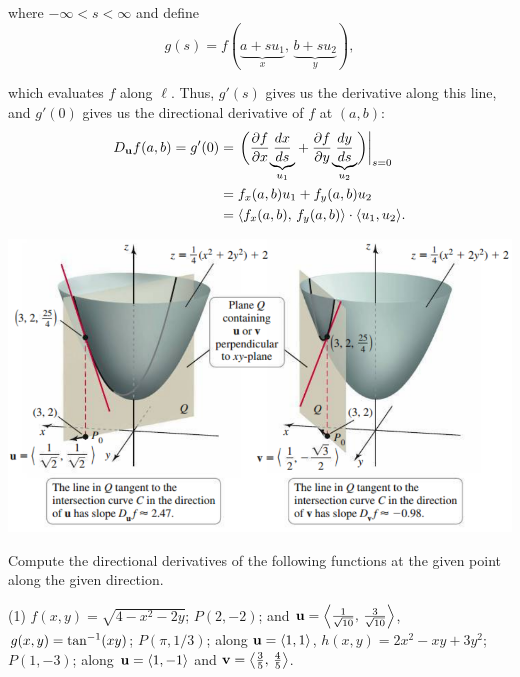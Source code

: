 \documentclass[mathNotesPreamble]{subfiles}
\begin{document}
  where $-\infty<s<\infty$ and define
    \[g(s)=f(\underbrace{a+su_1}_x,\,\underbrace{b+su_2}_y),\]

  which evaluates $f$ along $\ell$. Thus, $g'(s)$ gives us the derivative along this line, and $g'(0)$ gives us the directional derivative of $f$ at $(a,b)$:
  \begin{align*}
    D_{\mathbf{u}} f(a,b)=g'(0)&=\left.{\left(\frac{\partial f}{\partial x}\smash{\underbrace{\frac{dx}{ds}}_{u_1}}+\frac{\partial f}{\partial y}\smash{\underbrace{\frac{dy}{ds}}_{u_2}}\right)}\right|_{s=0}\\[0.75\baselineskip]
      &=f_x(a,b) u_1+f_y(a,b)u_2\\
      &={\left\langle f_x(a,b),\,f_y(a,b) \right\rangle}\cdot{\left\langle u_1,u_2 \right\rangle}.
  \end{align*}

  \noindent
  \begin{center}
    \includegraphics[width=0.55\linewidth]{images/briggs_15_05/fig15_48}
  \end{center}
  \pagebreak

  \begin{ex*}
    Compute the directional derivatives of the following functions at the given point along the given direction.
  \end{ex*}
  \begin{tasks}[after-item-skip=\stretch{1}, label=](1)
    \task $f(x,y)=\sqrt{4-x^2-2y}$; $P(2,-2)$; and ${\mathbf{u}}={\left\langle \frac{1}{\sqrt{10}},\,\frac{3}{\sqrt{10}} \right\rangle}$,
    \task $g(x,y)=\tan^{-1}(xy)$; $P(\pi,1/3)$; along ${\mathbf{u}}={\left\langle 1,1 \right\rangle}$,
    \task $h(x,y)=2x^2-xy+3y^2$; $P(1,-3)$; along ${\mathbf{u}}={\left\langle 1,-1 \right\rangle}$ and ${\mathbf{v}}={\left\langle \frac{3}{5},\,\frac{4}{5} \right\rangle}$.
  \end{tasks}
  \pagebreak
\end{document}
